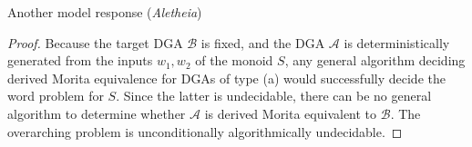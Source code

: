 \documentclass{article}
\theoremstyle{plain}
\theoremstyle{definition}
\begin{document}
\begin{solution}{Another model response (\emph{Aletheia})}
\begin{proof}
Because the target DGA $\mathcal{B}$ is fixed, and the DGA $\mathcal{A}$ is deterministically generated from the inputs $w_1, w_2$ of the monoid $S$, any general algorithm deciding derived Morita equivalence for DGAs of type (a) would successfully decide the word problem for $S$. Since the latter is undecidable, there can be no general algorithm to determine whether $\mathcal{A}$ is derived Morita equivalent to $\mathcal{B}$. The overarching problem is unconditionally algorithmically undecidable.
\end{proof}
\end{solution}
\end{document}

